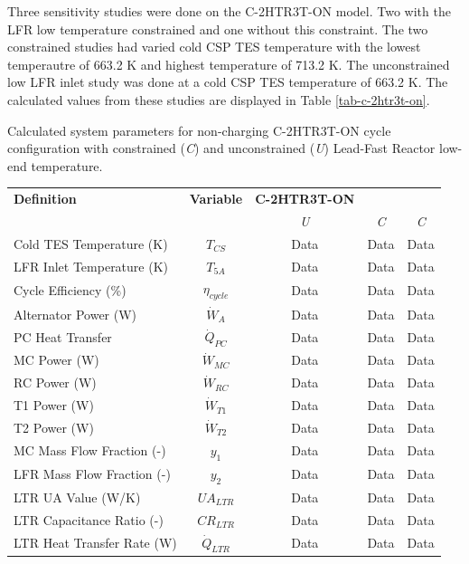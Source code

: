 \begin{paracol}{2}
\linenumbers
\switchcolumn

Three sensitivity studies were done on the C-2HTR3T-ON model. Two with the LFR low temperature constrained and one without this constraint. The two constrained studies had varied cold CSP TES temperature with the lowest temperautre of 663.2 K and highest temperature of 713.2 K. The unconstrained low LFR inlet study was done at a cold CSP TES temperature of 663.2 K. The calculated values from these studies are displayed in Table \ref{tab-c-2htr3t-on}. 

\begin{specialtable}[H]
    \caption{Calculated system parameters for non-charging C-2HTR3T-ON cycle configuration with constrained (\textit{C}) and unconstrained (\textit{U}) Lead-Fast Reactor low-end temperature.\label{tab-c-2htr3t-on}}
    \begin{tabular}{lcccc}
    \toprule
    \textbf{Definition} & \textbf{Variable} & \textbf{C-2HTR3T-ON} &\\
    & & \textit{U} & \textit{C} & \textit{C}\\
    \midrule	
    Cold TES Temperature (K)	&	$T_{CS}$	&	Data	&	Data	&	Data	\\
    LFR Inlet Temperature (K)	&	$T_{5A}$	&	Data	&	Data	&	Data	\\
    Cycle Efficiency (\%)	&	$\eta_{cycle}$	&	Data	&	Data	&	Data	\\
    Alternator Power (W)	&	$\dot{W}_{A}$	&	Data	&	Data	&	Data	\\
    PC Heat Transfer	&	$\dot{Q}_{PC}$	&	Data	&	Data	&	Data	\\
    MC Power (W)	&	$\dot{W}_{MC}$	&	Data	&	Data	&	Data	\\
    RC Power (W)	&	$\dot{W}_{RC}$	&	Data	&	Data	&	Data	\\
    T1 Power (W)	&	$\dot{W}_{T1}$	&	Data	&	Data	&	Data	\\
    T2 Power (W)	&	$\dot{W}_{T2}$	&	Data	&	Data	&	Data	\\
    MC Mass Flow Fraction (-)	&	$y_{1}$	&	Data	&	Data	&	Data	\\
    LFR Mass Flow Fraction (-)	&	$y_{2}$	&	Data	&	Data	&	Data	\\
    LTR UA Value (W/K)	&	$UA_{LTR}$	&	Data	&	Data	&	Data	\\
    LTR Capacitance Ratio (-)	&	$CR_{LTR}$	&	Data	&	Data	&	Data	\\
    LTR Heat Transfer Rate (W)	&	$\dot{Q}_{LTR}$	&	Data	&	Data	&	Data	\\

\end{tabular}
\end{specialtable}
\end{paracol}
